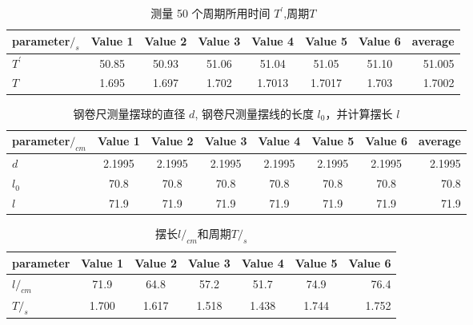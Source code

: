 \documentclass{article}
\begin{document}
    \begin{table}[!hbtp]
        \begin{center}
        \caption{测量 50 个周期所用时间 $T^{'}$,周期$T$}
        \begin{tabular}{l|c|c|c|c|c|c|r} %
            \textbf{parameter$/_{s}$} & \textbf{Value 1} & \textbf{Value 2} & \textbf{Value 3} & \textbf{Value 4} & \textbf{Value 5} & \textbf{Value 6} & \textbf{average}\\
            \hline
            $T^{'}$ & 50.85 & 50.93 & 51.06 & 51.04 & 51.05 & 51.10 & 51.005 \\
            $T$ & 1.695 & 1.697 & 1.702 & 1.7013 & 1.7017 & 1.703 & 1.7002 \\
        \end{tabular}
        \end{center}
    \end{table}

    \begin{table}[!hbtp]
        \begin{center}
        \caption{钢卷尺测量摆球的直径 $d$, 钢卷尺测量摆线的长度 $l_{0}$，并计算摆长 $l$}
        \begin{tabular}{l|c|c|c|c|c|c|r} %
            \textbf{parameter$/_{cm}$} & \textbf{Value 1} & \textbf{Value 2} & \textbf{Value 3} & \textbf{Value 4} & \textbf{Value 5} & \textbf{Value 6} & \textbf{average}\\
            \hline
            $d$ & 2.1995 & 2.1995 & 2.1995 & 2.1995 & 2.1995 & 2.1995 & 2.1995 \\
            $l_{0}$ & 70.8 & 70.8 & 70.8 & 70.8 & 70.8 & 70.8 & 70.8 \\
            $l$ & 71.9 & 71.9 & 71.9 & 71.9 & 71.9 & 71.9 & 71.9 \\
        \end{tabular}
        \end{center}
    \end{table}

    \begin{table}[!hbtp]
        \begin{center}
        \caption{摆长$l/_{cm}$和周期$T/_{s}$}
        \begin{tabular}{l|c|c|c|c|c|r} %
            \textbf{parameter} & \textbf{Value 1} & \textbf{Value 2} & \textbf{Value 3} & \textbf{Value 4} & \textbf{Value 5} & \textbf{Value 6}\\
            \hline
            $l/_{cm}$ & 71.9 & 64.8 & 57.2 & 51.7 & 74.9 & 76.4 \\
            $T/_{s}$ & 1.700 & 1.617 & 1.518 & 1.438 & 1.744 & 1.752 \\
        \end{tabular}
        \end{center}
    \end{table}
\end{document}
